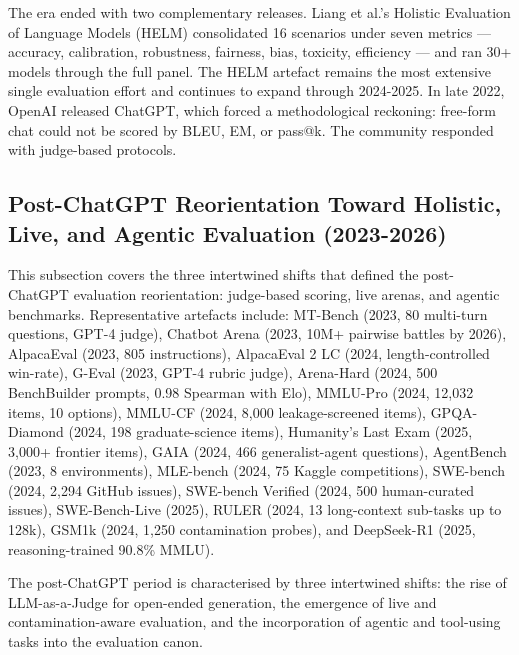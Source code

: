 \documentclass{article}
\begin{document}
The era ended with two complementary releases. Liang et al.'s Holistic Evaluation of Language Models (HELM) \cite{liang20222022} consolidated 16 scenarios under seven metrics --- accuracy, calibration, robustness, fairness, bias, toxicity, efficiency --- and ran 30+ models through the full panel. The HELM artefact remains the most extensive single evaluation effort and continues to expand through 2024-2025. In late 2022, OpenAI released ChatGPT, which forced a methodological reckoning: free-form chat could not be scored by BLEU, EM, or pass@k. The community responded with judge-based protocols.

\subsection{Post-ChatGPT Reorientation Toward Holistic, Live, and Agentic Evaluation (2023-2026)}\label{post-chatgpt-reorientation-toward-holistic-live-and-agentic-evaluation-2023-2026}

This subsection covers the three intertwined shifts that defined the post-ChatGPT evaluation reorientation: judge-based scoring, live arenas, and agentic benchmarks. Representative artefacts include: MT-Bench (2023, 80 multi-turn questions, GPT-4 judge), Chatbot Arena (2023, 10M+ pairwise battles by 2026), AlpacaEval (2023, 805 instructions), AlpacaEval 2 LC (2024, length-controlled win-rate), G-Eval (2023, GPT-4 rubric judge), Arena-Hard (2024, 500 BenchBuilder prompts, 0.98 Spearman with Elo), MMLU-Pro (2024, 12,032 items, 10 options), MMLU-CF (2024, 8,000 leakage-screened items), GPQA-Diamond (2024, 198 graduate-science items), Humanity's Last Exam (2025, 3,000+ frontier items), GAIA (2024, 466 generalist-agent questions), AgentBench (2023, 8 environments), MLE-bench (2024, 75 Kaggle competitions), SWE-bench (2024, 2,294 GitHub issues), SWE-bench Verified (2024, 500 human-curated issues), SWE-Bench-Live (2025), RULER (2024, 13 long-context sub-tasks up to 128k), GSM1k (2024, 1,250 contamination probes), and DeepSeek-R1 (2025, reasoning-trained 90.8\% MMLU).

The post-ChatGPT period is characterised by three intertwined shifts: the rise of LLM-as-a-Judge for open-ended generation, the emergence of live and contamination-aware evaluation, and the incorporation of agentic and tool-using tasks into the evaluation canon.
\end{document}
